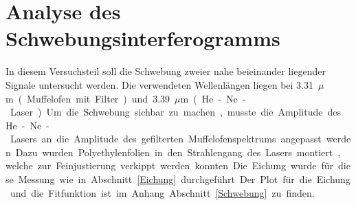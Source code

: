 \section{Analyse des Schwebungsinterferogramms}
In diesem Versuchsteil soll die Schwebung zweier nahe beieinander liegender Signale untersucht werden. Die verwendeten Wellenlängen liegen bei \SI{3.31}{$\mu$m} (Muffelofen mit Filter) und \SI{3.39}{$\mu$m} (He-Ne-Laser). Um die Schwebung sichbar zu machen, musste die Amplitude des He-Ne-Lasers an die Amplitude des gefilterten Muffelofenspektrums angepasst werden. Dazu wurden Polyethylenfolien in den Strahlengang des Lasers montiert, welche zur Feinjustierung verkippt werden konnten. Die Eichung wurde für diese Messung wie in Abschnitt \ref{Eichung} durchgeführt. Der Plot für die Eichung und die Fitfunktion ist im Anhang Abschnitt \ref{Schwebung} zu finden.